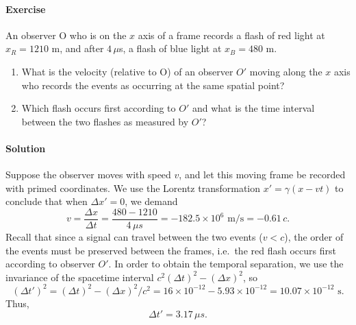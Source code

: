 \documentclass[10pt]{article}
\newcounter{prob}
\def\problem{\stepcounter{prob}\paragraph{Exercise \arabic{prob}}}
\def\solution{\paragraph{Solution}}
\begin{document}
        \problem An observer O who is on the $x$ axis of a frame records a flash of red light at $x_R = 1210$ m, and after $4\,\mu$s, 
        a flash of blue light at $x_B = 480$ m.
        \begin{enumerate}
                \item What is the velocity (relative to O) of an observer $O'$ moving along the $x$ axis who records the
                events as occurring at the same spatial point?
                \item Which flash occurs first according to $O'$ and what is the time interval between the two flashes as measured by $O'$?
        \end{enumerate}

        \solution Suppose the observer moves with speed $v$, and let this moving frame be recorded with primed coordinates.
        We use the Lorentz transformation $x' = \gamma(x - vt)$ to conclude that when $\Delta x' = 0$, we demand
        \[
                v = \frac{\Delta x}{\Delta t} = \frac{480 - 1210}{4\,\mu s} = -182.5\times 10^6 \text{ m/s} = -0.61\,c. \tag{a}
        \]
        Recall that since a signal can travel between the two events ($v < c$), the order of the events must be preserved between the frames,
        i.e.\ the red flash occurs first according to observer $O'$. In order to obtain the temporal separation, we use the invariance
        of the spacetime interval $c^2(\Delta t)^2 - (\Delta x)^2$, so
        \[
                (\Delta t')^2 = (\Delta t)^2 - (\Delta x)^2 /c^2 = 16\times 10^{-12} - 5.93\times 10^{-12} = 10.07\times 10^{-12} \text{ s}.
        \]
        Thus,
        \[
                \Delta t' = 3.17\,\mu s. \tag{b}
        \]
\end{document}
